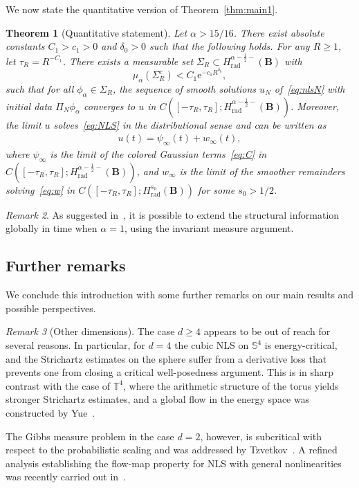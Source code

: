 \documentclass[11pt,reqno,english]{amsart}
\numberwithin{equation}{section}
\theoremstyle{plain}
\newtheorem{theorem}{Theorem}[section]
\theoremstyle{definition}
\theoremstyle{remark}
\newtheorem{remark}[theorem]{Remark}
\newcommand{\e}{\mathrm{e}}
\begin{document}
\medskip

We now state the quantitative version of Theorem~\ref{thm:main1}.
\begin{theorem}[Quantitative statement]
	\label{thm:quan}
	Let $\alpha>15/16$. There exist absolute constants $C_1>c_1>0$ and $\delta_0>0$ such that the following holds. For any $R\geq 1$, let $\tau_R=R^{-C_1}$. There exists a measurable set $\Sigma_R\subset H_{\mathrm{rad}}^{\alpha-\frac{1}{2}-}(\mathbf{B})$ with
	\[
	\mu_{\alpha}(\Sigma_{R}^c)<C_1\e^{-c_1R^{\delta_0}},
	\]
	such that for all $\phi_{\alpha}\in\Sigma_R$, the sequence of smooth solutions $u_N$ of~\eqref{eq:nlsN} with initial data $\Pi_N\phi_{\alpha}$ converges to $u$ in $C([-\tau_R,\tau_R];H_{\mathrm{rad}}^{\alpha-\frac{1}{2}-}(\mathbf{B}))$. Moreover, the limit $u$ solves~\eqref{eq:NLS} in the distributional sense and can be written as
	\begin{align*}
		u(t)=\psi_{\infty}(t)+w_{\infty}(t),
	\end{align*}
	where $\psi_{\infty}$ is the limit of the colored Gaussian terms~\eqref{eq:C} in $C([-\tau_R,\tau_R];H_{\mathrm{rad}}^{\alpha-\frac{1}{2}-}(\mathbf{B}))$, and $w_{\infty}$ is the limit of the smoother remainders solving~\eqref{eq:w} in $C([-\tau_R,\tau_R];H_{\mathrm{rad}}^{s_0}(\mathbf{B}))$ for some $s_0>1/2$.
\end{theorem}


\begin{remark}
	As suggested in~\cite[Remark~6.3]{DNY24}, it is possible to extend the structural information globally in time when $\alpha=1$, using the invariant measure argument.
\end{remark}


\subsection{Further remarks}
We conclude this introduction with some further remarks on our main results and possible perspectives.

\begin{remark}[Other dimensions]
	The case $d\geq 4$ appears to be out of reach for several reasons.
	In particular, for $d=4$ the cubic NLS on $\mathbb{S}^4$ is energy-critical,
	and the Strichartz estimates on the sphere suffer from a derivative loss that
	prevents one from closing a critical well-posedness argument.
	This is in sharp contrast with the case of $\mathbb{T}^{4}$, where the
	arithmetic structure of the torus yields stronger Strichartz estimates, and a
	global flow in the energy space was constructed by Yue~\cite{Yue21}.
	
	The Gibbs measure problem in the case $d=2$, however, is subcritical with respect to
	the probabilistic scaling and was addressed by
	Tzvetkov~\cite{Tzv08}. A refined analysis establishing the flow-map property for NLS with general nonlinearities
	was recently carried out in~\cite{FW25}.
\end{remark}
\end{document}
